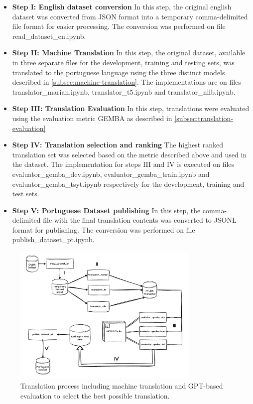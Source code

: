 \documentclass{article}
\begin{document}
\begin{itemize}
    \item \textbf{Step I: English dataset conversion} In this step, the original
    english dataset was converted from JSON format into a temporary 
    comma-delimited file format for easier processing. The conversion was
    performed on file read\_dataset\_en.ipynb.
    \item \textbf{Step II: Machine Translation} In this step, the original
    dataset, available in three separate files for the development, training and
    testing sets, was translated to the portuguese language using the three
    distinct models described in \ref{subsec:machine-translation}. The
    implementations are on files translator\_marian.ipynb, translator\_t5.ipynb
    and translator\_nllb.ipynb.
    \item \textbf{Step III: Translation Evaluation} In this step, translations were evaluated
    using the evaluation metric GEMBA as described in \ref{subsec:translation-evaluation}
    \item \textbf{Step IV: Translation selection and ranking} The highest ranked translation set
    was selected based on the metric described above and used in the dataset.
    The implementation for steps III and IV is executed on files
    evaluator\_gemba\_dev.ipynb, evaluator\_gemba\_train.ipynb and
    evaluator\_gemba\_tsyt.ipynb respectively for the development, training and
    test sets.
    \item \textbf{Step V: Portuguese Dataset publishing}  In this step, the
    comma-delimited file with the final translation contents was converted to
    JSONL format for publishing. The conversion was performed on file 
    publish\_dataset\_pt.ipynb.
\end{itemize}
 
\begin{figure}[htbp]
    \centering
    \includegraphics[width=0.8\textwidth]{drawio/translation.drawio.pdf}
    \caption{\label{fig:diagram}Translation process including machine
    translation and GPT-based evaluation to select the best possible
    translation.}
\end{figure}
\end{document}
